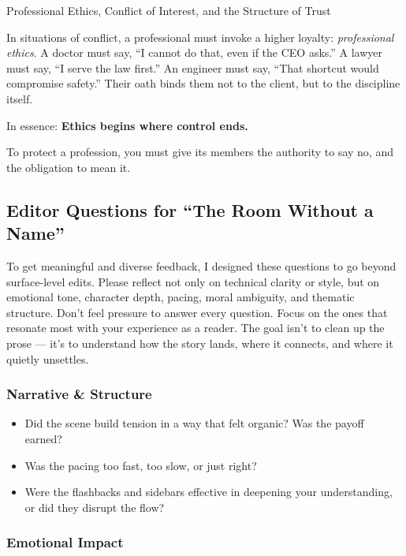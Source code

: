 \begin{PhilosophicalSidebar}{Professional Ethics, Conflict of Interest, and the Structure of Trust}
  \medskip
  
  
  In situations of conflict, a professional must invoke a higher loyalty: \textit{professional ethics}. A doctor must say, 
  ``I cannot do that, even if the CEO asks.'' A lawyer must say, ``I serve the law first.'' An engineer must say, ``That shortcut 
  would compromise safety.'' Their oath binds them not to the client, but to the discipline itself.

  \medskip
  
  In essence: \textbf{Ethics begins where control ends.}

  \medskip
  
  To protect a profession, you must give its members the authority to say no, and the obligation to mean it.
  
\end{PhilosophicalSidebar}


\subsection{Editor Questions for ``The Room Without a Name''}

To get meaningful and diverse feedback, I designed these questions to go beyond surface-level edits. 
Please reflect not only on technical clarity or style, but on emotional tone, character depth, pacing, 
moral ambiguity, and thematic structure. Don’t feel pressure to answer every question. Focus on the 
ones that resonate most with your experience as a reader. The goal isn’t to clean up the prose — it’s 
to understand how the story lands, where it connects, and where it quietly unsettles.

\subsubsection{Narrative \& Structure}

\begin{itemize}
  \item Did the scene build tension in a way that felt organic? Was the payoff earned?
  \item Was the pacing too fast, too slow, or just right?
  \item Were the flashbacks and sidebars effective in deepening your understanding, or did they disrupt the flow?
\end{itemize}

\subsubsection{Emotional Impact}

